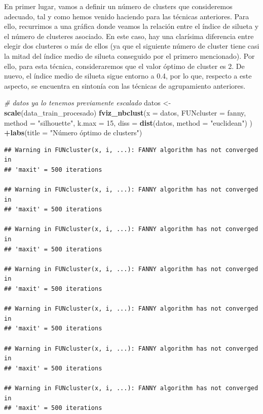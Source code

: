\documentclass[spanish,]{article}
\newenvironment{Shaded}{\begin{snugshade}}{\end{snugshade}}
\newcommand{\KeywordTok}[1]{\textcolor[rgb]{0.13,0.29,0.53}{\textbf{#1}}}
\newcommand{\DataTypeTok}[1]{\textcolor[rgb]{0.13,0.29,0.53}{#1}}
\newcommand{\DecValTok}[1]{\textcolor[rgb]{0.00,0.00,0.81}{#1}}
\newcommand{\StringTok}[1]{\textcolor[rgb]{0.31,0.60,0.02}{#1}}
\newcommand{\CommentTok}[1]{\textcolor[rgb]{0.56,0.35,0.01}{\textit{#1}}}
\newcommand{\OperatorTok}[1]{\textcolor[rgb]{0.81,0.36,0.00}{\textbf{#1}}}
\newcommand{\NormalTok}[1]{#1}
\begin{document}
En primer lugar, vamos a definir un número de clusters que consideremos
adecuado, tal y como hemos venido haciendo para las técnicas anteriores.
Para ello, recurrimos a una gráfica donde veamos la relación entre el
índice de silueta y el número de clusteres asociado. En este caso, hay
una clarísima diferencia entre elegir dos clusteres o más de ellos (ya
que el siguiente número de cluster tiene casi la mitad del índice medio
de silueta conseguido por el primero mencionado). Por ello, para esta
técnica, consideraremos que el valor óptimo de cluster es 2. De nuevo,
el índice medio de silueta sigue entorno a 0.4, por lo que, respecto a
este aspecto, se encuentra en sintonía con las técnicas de agrupamiento
anteriores.

\begin{Shaded}
\begin{Highlighting}[]
\CommentTok{# datos ya lo tenemos previamente escalado }
\NormalTok{datos <-}\StringTok{ }\KeywordTok{scale}\NormalTok{(data_train_procesado)}
\KeywordTok{fviz_nbclust}\NormalTok{(}\DataTypeTok{x =}\NormalTok{ datos, }\DataTypeTok{FUNcluster =}\NormalTok{ fanny, }\DataTypeTok{method =} \StringTok{"silhouette"}\NormalTok{, }\DataTypeTok{k.max =} \DecValTok{15}\NormalTok{,}
             \DataTypeTok{diss =} \KeywordTok{dist}\NormalTok{(datos, }\DataTypeTok{method =} \StringTok{"euclidean"}\NormalTok{) ) }\OperatorTok{+}\KeywordTok{labs}\NormalTok{(}\DataTypeTok{title =} \StringTok{"Número óptimo de clusters"}\NormalTok{)}
\end{Highlighting}
\end{Shaded}

\begin{verbatim}
## Warning in FUNcluster(x, i, ...): FANNY algorithm has not converged in
## 'maxit' = 500 iterations

## Warning in FUNcluster(x, i, ...): FANNY algorithm has not converged in
## 'maxit' = 500 iterations

## Warning in FUNcluster(x, i, ...): FANNY algorithm has not converged in
## 'maxit' = 500 iterations

## Warning in FUNcluster(x, i, ...): FANNY algorithm has not converged in
## 'maxit' = 500 iterations

## Warning in FUNcluster(x, i, ...): FANNY algorithm has not converged in
## 'maxit' = 500 iterations

## Warning in FUNcluster(x, i, ...): FANNY algorithm has not converged in
## 'maxit' = 500 iterations

## Warning in FUNcluster(x, i, ...): FANNY algorithm has not converged in
## 'maxit' = 500 iterations
\end{verbatim}
\end{document}
